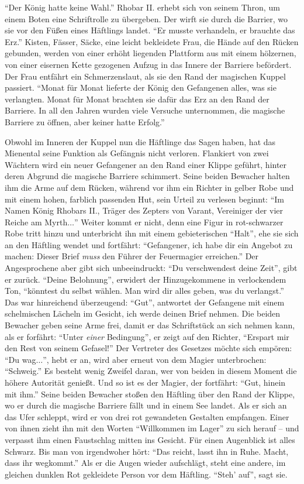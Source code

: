 \documentclass[a5paper,pagesize]{scrbook}
\begin{document}
\enquote{Der König hatte keine Wahl.}
Rhobar II. erhebt sich von seinem Thron, um einem Boten eine Schriftrolle zu übergeben.
Der wirft sie durch die Barrier, wo sie vor den Füßen eines Häftlings landet.
\enquote{Er musste verhandeln, er brauchte das Erz.}
Kisten, Fässer, Säcke, eine leicht bekleidete Frau, die Hände auf den Rücken gebunden, werden von einer erhöht liegenden Plattform aus mit einem hölzernen, von einer eisernen Kette gezogenen Aufzug in das Innere der Barriere befördert.
Der Frau entfährt ein Schmerzenslaut, als sie den Rand der magischen Kuppel passiert.
\enquote{Monat für Monat lieferte der König den Gefangenen alles, was sie verlangten.
Monat für Monat brachten sie dafür das Erz an den Rand der Barriere.
In all den Jahren wurden viele Versuche unternommen, die magische Barriere zu öffnen, aber keiner hatte Erfolg.}

Obwohl im Inneren der Kuppel nun die Häftlinge das Sagen haben, hat das Mienental seine Funktion als Gefängnis nicht verloren.
Flankiert von zwei Wächtern wird ein neuer Gefangener an den Rand einer Klippe geführt, hinter deren Abgrund die magische Barriere schimmert.
Seine beiden Bewacher halten ihm die Arme auf dem Rücken, während vor ihm ein Richter in gelber Robe und mit einem hohen, farblich passenden Hut, sein Urteil zu verlesen beginnt:
\enquote{Im Namen König Rhobars II., Träger des Zepters von Varant, Vereiniger der vier Reiche am Myrth$\ldots$}
Weiter kommt er nicht, denn eine Figur in rot-schwarzer Robe tritt hinzu und unterbricht ihn mit einem gebieterischen \enquote{Halt}, ehe sie sich an den Häftling wendet und fortfährt:
\enquote{Gefangener, ich habe dir ein Angebot zu machen:
Dieser Brief \textit{muss} den Führer der Feuermagier erreichen.}
Der Angesprochene aber gibt sich unbeeindruckt:
\enquote{Du verschwendest deine Zeit}, gibt er zurück.
\enquote{Deine Belohnung}, erwidert der Hinzugekommene in verlockendem Ton, \enquote{könntest du selbst wählen.
Man wird dir alles geben, was du verlangst.}
Das war hinreichend überzeugend:
\enquote{Gut}, antwortet der Gefangene mit einem schelmischen Lächeln im Gesicht, {ich werde deinen Brief nehmen.}
Die beiden Bewacher geben seine Arme frei, damit er das Schriftstück an sich nehmen kann, als er forfährt:
\enquote{Unter \textit{einer} Bedingung}, er zeigt auf den Richter, \enquote{Erspart mir den Rest von seinem Gefasel!}
Der Vertreter des Gesetzes möchte sich empören:
\enquote{Du wag$\ldots$}, hebt er an, wird aber erneut von dem Magier unterbrochen:
\enquote{Schweig.}
Es besteht wenig Zweifel daran, wer von beiden in diesem Moment die höhere Autorität genießt.
Und so ist es der Magier, der fortfährt:
\enquote{Gut, hinein mit ihm.}
Seine beiden Bewacher stoßen den Häftling über den Rand der Klippe, wo er durch die magische Barriere fällt und in einem See landet.
Als er sich an das Ufer schleppt, wird er von drei rot gewandeten Gestalten empfangen.
Einer von ihnen zieht ihn mit den Worten \enquote{Willkommen im Lager} zu sich herauf -- und verpasst ihm einen Faustschlag mitten ins Gesicht.
Für einen Augenblick ist alles Schwarz.
Bis man von irgendwoher hört:
\enquote{Das reicht, lasst ihn in Ruhe.
Macht, dass ihr wegkommt.}
Als er die Augen wieder aufschlägt, steht eine andere, im gleichen dunklen Rot gekleidete Person vor dem Häftling.
\enquote{Steh' auf}, sagt sie.
\end{document}
